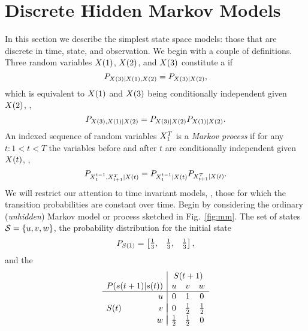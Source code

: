 \section{Discrete Hidden Markov Models}
\label{sec:intro_hmm}
%

In this section we describe the simplest state space models: those
that are discrete in time, state, and observation.  We begin with a
couple of definitions.  Three random variables ${X}{(1)}$,
${X}{(2)}$, and ${X}{(3)}$ constitute a \emph{}
if
\begin{equation}
  \label{eq:MarkovChain}
  P_{{X}{(3)}|{X}{(1)},{X}{(2)}} = P_{{X}{(3)}|{X}{(2)}},
\end{equation}
which is equivalent to ${X}{(1)}$ and ${X}{(3)}$ being conditionally
independent given ${X}{(2)}$, \ie,
\begin{equation*}
  P_{{X}{(3)},{X}{(1)}|{X}{(2)}} = P_{{X}{(3)}|{X}{(2)}}   P_{{X}{(1)}|{X}{(2)}}.
\end{equation*}
An indexed sequence of random variables $X_{1}^{T}$ is a
\emph{Markov process}  if
for any $t: 1 < t < T$ the variables before and after $t$ are
conditionally independent given ${X}{(t)}$, \ie,
\begin{equation}
  \label{eq:MarkovProcess}
  P_{X_{1}^{t-1},X_{t+1}^{T}|{X}{(t)}} =
  P_{X_{1}^{t-1}|{X}{(t)}} P_{X_{t+1}^{T}|{X}{(t)}}.
\end{equation}
We will restrict our attention to time invariant models, \ie, those
for which the transition probabilities are constant over time.
Begin by considering the ordinary (\emph{unhidden})
Markov model or process sketched in Fig.~\ref{fig:mm}.  The set of
states $\states = \left\{u,v,w\right\}$, the probability distribution
for the initial state
\begin{equation}
  \label{eq:InitialProbabilites}
P_{{S}{(1)}} =
\begin{bmatrix}
  \frac{1}{3}, & \frac{1}{3}, & \frac{1}{3}
\end{bmatrix},  
\end{equation}
and the  %
%
\begin{equation}
  \label{eq:TransitionMatrix}
\begin{array}{rr|ccc}
  && \multicolumn{3}{c}{\ti{S}{t+1}} \\
  \multicolumn{2}{c|}{P(\ti{s}{t+1}|\ti{s}{t})} & u & v & w \\ \hline
  & u & 0 & 1 & 0 \\  && \vspace{-1 em} \\
  \ti{S}{t} & v & 0 & \frac{1}{2} & \frac{1}{2} \\  && \vspace{-0.98 em} \\
  & w & \frac{1}{2} & \frac{1}{2} & 0
\end{array}
\end{equation}
